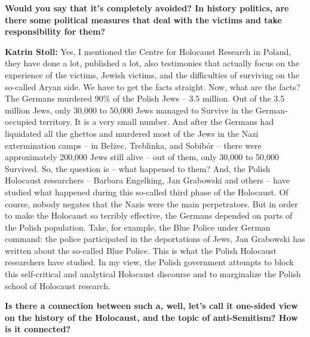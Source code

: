 \textbf{Would you say that it’s completely avoided? In history politics, are there some political measures that deal with the victims and take responsibility for them?} 

\textbf{Katrin Stoll:} Yes, I mentioned the Centre for Holocaust Research in Poland, they have done a lot, published a lot, also testimonies that actually focus on the experience of the victims, Jewish victims, and the difficulties of surviving on the so-called Aryan side. We have to get the facts straight. Now, what are the facts? The Germans murdered 90\% of the Polish Jews – 3.5 million. Out of the 3.5 million Jews, only 30,000 to 50,000 Jews managed to Survive in the German-occupied territory. It is a very small number. And after the Germans had liquidated all the ghettos and murdered most of the Jews in the Nazi extermination camps – in Bełżec, Treblinka, and Sobibór – there were approximately 200,000 Jews still alive – out of them, only 30,000 to 50,000 Survived. So, the question is – what happened to them? And, the Polish Holocaust researchers – Barbara Engelking, Jan Grabowski and others – have studied what happened during this so-called third phase of the Holocaust. Of course, nobody negates that the Nazis were the main perpetrators. But in order to make the Holocaust so terribly effective, the Germans depended on parts of the Polish population. Take, for example, the Blue Police under German command: the police participated in the deportations of Jews, Jan Grabowski has written about the so-called Blue Police. This is what the Polish Holocaust researchers have studied. In my view, the Polish government attempts to block this self-critical and analytical Holocaust discourse and to marginalize the Polish school of Holocaust research.  

\textbf{Is there a connection between such a, well, let’s call it one-sided view on the history of the Holocaust, and the topic of anti-Semitism? How is it connected?} 

